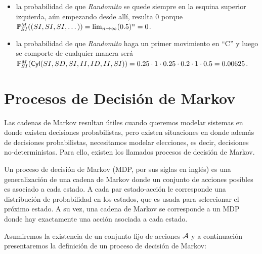 \begin{itemize}
	\item la probabilidad de que \emph{Randomito} se quede siempre en la esquina superior
	      izquierda, aún empezando desde allí, resulta 0 porque $\mathbb{P}^M_{SI}((SI, SI,
		      SI, \dots)) = \lim_{n\to \infty} (0.5)^n = 0$.
	\item la probabilidad de que \emph{Randomito} haga un primer movimiento en ``C'' y
	      luego se comporte de cualquier manera será $\mathbb{P}^M_{SI}(\textsf{Cyl}(SI, SD, SI, II,
		      ID, II, SI)) = 0.25 \cdot 1 \cdot 0.25 \cdot 0.2 \cdot 1 \cdot 0.5 = 0.00625$.
\end{itemize}



\section{Procesos de Decisión de Markov}

Las cadenas de Markov resultan útiles cuando queremos modelar sistemas en donde
existen decisiones probabilistas, pero existen situaciones en donde además de
decisiones probabilistas, necesitamos modelar elecciones, es decir, decisiones
no-deterministas. Para ello, existen los llamados procesos de decisión de
Markov.

Un proceso de decisión de Markov (MDP, por sus siglas en inglés) es una
generalización de una cadena de Markov donde un conjunto de acciones posibles
es asociado a cada estado. A cada par estado-acción le corresponde una
distribución de probabilidad en los estados, que es usada para seleccionar el
próximo estado. A su vez, una cadena de Markov se corresponde a un MDP donde
hay exactamente una acción asociada a cada estado.

Asumiremos la existencia de un conjunto fijo de acciones $\mathcal{A}$ y a
continuación presentaremos la definición de un proceso de decisión de Markov:

